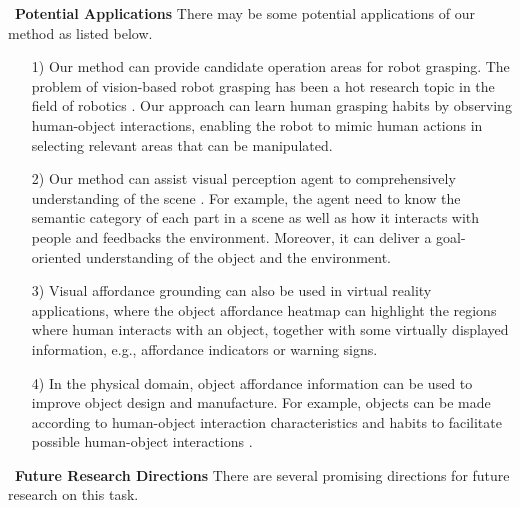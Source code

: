 \documentclass[journal,twoside]{IEEEtran}
\newcommand{\myPara}[1]{\vspace{5pt}\noindent~\textbf{#1} \quad}
\begin{document}
\myPara{Potential Applications}
There may be some potential applications of our method as listed below.
\begin{itemize}
    
    \item [1)]
    Our method can provide candidate operation areas for robot grasping. The problem of vision-based robot grasping has been a hot research topic in the field of robotics \cite{du2021vision,fang2020learning,mahler2017dex}. Our approach can learn human grasping habits by observing human-object interactions, enabling the robot to mimic human actions in selecting relevant areas that can be manipulated.
    
    \item [2)]
    Our method can assist visual perception agent to comprehensively understanding of the scene \cite{DBLP:conf/cvpr/ZhuZZ15,Wang_affordanceCVPR2017}. For example, the agent need to know the semantic category of each part in a scene as well as how it interacts with people and feedbacks the environment. Moreover, it can deliver a goal-oriented understanding of the object and the environment.
    
    \item [3)]
    Visual affordance grounding can also be used in virtual reality \cite{fujinawa2017computational} applications, where the object affordance heatmap can highlight the regions where human interacts with an object, together with some virtually displayed information, e.g., affordance indicators or warning signs.
    
    \item[4)]
    In the physical domain, object affordance information can be used to improve object design and manufacture. For example, objects can be made according to human-object interaction characteristics and habits to facilitate possible human-object interactions \cite{zhao2018characterizes}.

\end{itemize}

\myPara{Future Research Directions} There are several promising directions for future research on this task.
\end{document}
